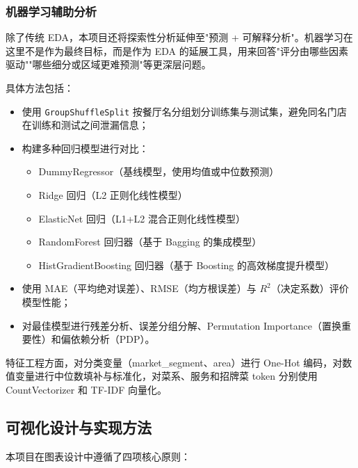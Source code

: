 \documentclass[11pt,a4paper]{article}
\begin{document}
\subsubsection{机器学习辅助分析}

除了传统 EDA，本项目还将探索性分析延伸至"预测 + 可解释分析"。机器学习在这里不是作为最终目标，而是作为 EDA 的延展工具，用来回答"评分由哪些因素驱动""哪些细分或区域更难预测"等更深层问题。

具体方法包括：
\begin{itemize}[leftmargin=2em]
    \item 使用 \texttt{GroupShuffleSplit} 按餐厅名分组划分训练集与测试集，避免同名门店在训练和测试之间泄漏信息；
    \item 构建多种回归模型进行对比：
    \begin{itemize}[leftmargin=1.5em]
        \item DummyRegressor（基线模型，使用均值或中位数预测）
        \item Ridge 回归（L2 正则化线性模型）
        \item ElasticNet 回归（L1+L2 混合正则化线性模型）
        \item RandomForest 回归器（基于 Bagging 的集成模型）
        \item HistGradientBoosting 回归器（基于 Boosting 的高效梯度提升模型）
    \end{itemize}
    \item 使用 MAE（平均绝对误差）、RMSE（均方根误差）与 $R^2$（决定系数）评价模型性能；
    \item 对最佳模型进行残差分析、误差分组分解、Permutation Importance（置换重要性）和偏依赖分析（PDP）。
\end{itemize}

特征工程方面，对分类变量（market\_segment、area）进行 One-Hot 编码，对数值变量进行中位数填补与标准化，对菜系、服务和招牌菜 token 分别使用 CountVectorizer 和 TF-IDF 向量化。

\subsection{可视化设计与实现方法}

本项目在图表设计中遵循了四项核心原则：
\end{document}
